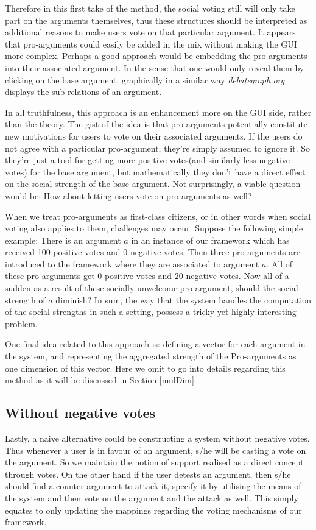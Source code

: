 \documentclass{article}
\begin{document}
Therefore in this first take of the method, the social voting still will only take part on the arguments themselves, thus these structures should be interpreted as additional reasons to make users vote on that particular argument. It appears that pro-arguments could easily be added in the mix without making the GUI more complex. Perhaps a good approach would be embedding the pro-arguments into their associated argument. In the sense that one would only reveal them by clicking on the base argument, graphically in a similar way \textit{debategraph.org} displays the sub-relations of an argument. 

In all truthfulness, this approach is an enhancement more on the GUI side, rather than the theory. The gist of the idea is that pro-arguments potentially constitute new motivations for users to vote on their associated arguments.  If the users do not agree with a particular pro-argument, they're simply assumed to ignore it. So they're just a tool for getting more positive votes(and similarly less negative votes) for the base argument, but mathematically they don't have a direct effect on the social strength of the base argument. Not surprisingly, a viable question would be: How about letting users vote on pro-arguments as well?

When we treat pro-arguments as first-class citizens, or in other words when social voting also applies to them, challenges may occur. Suppose the following simple example: There is an argument $a$ in an instance of our framework which has received 100 positive votes and 0 negative votes. Then three pro-arguments are introduced to the framework where they are associated to argument $a$. All of these pro-arguments get 0 positive votes and 20 negative votes. Now all of a sudden as a result of these socially unwelcome pro-argument, should the social strength of $a$ diminish? In sum, the way that the system handles the computation of the social strengths in such a setting, possess a tricky yet highly interesting problem.

One final idea related to this approach is: defining a vector for each argument in the system, and representing the aggregated strength of the Pro-arguments as one dimension of this vector. Here we omit to go into details regarding this method as it will be discussed in Section \ref{mulDim}.


\subsection{Without negative votes}
Lastly, a naive alternative could be constructing a system without negative votes. Thus whenever a user is in favour of an argument, s/he will be casting a vote on the argument. So we maintain the notion of support realised as  a direct concept through votes. On the other hand if the user detests an argument, then s/he should find a counter argument to attack it, specify it by utilising the means of the system and then vote on the argument and the attack as well. This simply equates to only updating the mappings regarding the voting mechanisms of our framework.
\end{document}
